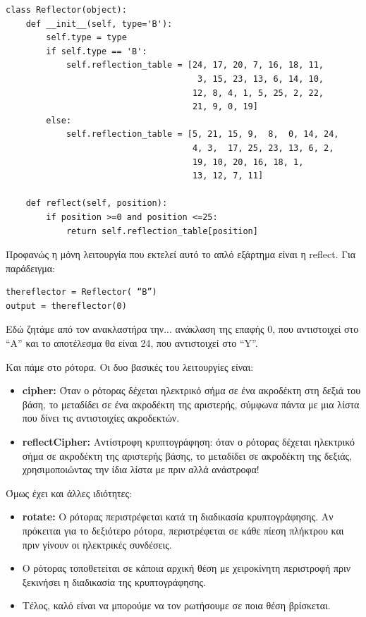 \documentclass[a4paper,twoside,12pt]{article}
\begin{document}
\begin{verbatim}
class Reflector(object):
    def __init__(self, type='B'):
        self.type = type
        if self.type == 'B':
            self.reflection_table = [24, 17, 20, 7, 16, 18, 11,
                                      3, 15, 23, 13, 6, 14, 10,
                                     12, 8, 4, 1, 5, 25, 2, 22,
                                     21, 9, 0, 19]
        else:
            self.reflection_table = [5, 21, 15, 9,  8,  0, 14, 24,
                                     4, 3,  17, 25, 23, 13, 6, 2,
                                     19, 10, 20, 16, 18, 1,
                                     13, 12, 7, 11] 
                
    def reflect(self, position):
        if position >=0 and position <=25:
            return self.reflection_table[position]
\end{verbatim}

Προφανώς η μόνη λειτουργία που εκτελεί αυτό το απλό εξάρτημα είναι η reflect. Για παράδειγμα:

\begin{verbatim}
thereflector = Reflector( “B”)
output = thereflector(0)
\end{verbatim}

Εδώ ζητάμε από τον ανακλαστήρα την... ανάκλαση της επαφής 0, που αντιστοιχεί στο “Α” και το αποτέλεσμα θα είναι 24, που αντιστοιχεί στο “Y”.

Και πάμε στο ρότορα. Οι δυο βασικές του λειτουργίες είναι:

\begin{itemize}
\item \textbf{cipher:} Όταν ο ρότορας δέχεται ηλεκτρικό σήμα σε ένα ακροδέκτη στη δεξιά του βάση, το μεταδίδει σε ένα ακροδέκτη της αριστερής, σύμφωνα πάντα με μια λίστα που δίνει τις αντιστοιχίες ακροδεκτών.

\item \textbf{reflectCipher:} Αντίστροφη κρυπτογράφηση: όταν ο ρότορας δέχεται ηλεκτρικό σήμα σε ακροδέκτη της αριστερής βάσης, το μεταδίδει σε ακροδέκτη της δεξιάς, χρησιμοποιώντας την ίδια λίστα με πριν αλλά ανάστροφα!
\end{itemize}

Όμως έχει και άλλες ιδιότητες:

\begin{itemize}
\item \textbf{rotate:} Ο ρότορας περιστρέφεται κατά τη διαδικασία κρυπτογράφησης. Αν πρόκειται για το δεξιότερο ρότορα, περιστρέφεται σε κάθε πίεση πλήκτρου και πριν γίνουν οι ηλεκτρικές συνδέσεις.
\item Ο ρότορας τοποθετείται σε κάποια αρχική θέση με χειροκίνητη περιστροφή πριν ξεκινήσει η διαδικασία της κρυπτογράφησης.
\item Τέλος, καλό είναι να μπορούμε να τον ρωτήσουμε σε ποια θέση βρίσκεται.
\end{itemize}
\end{document}
